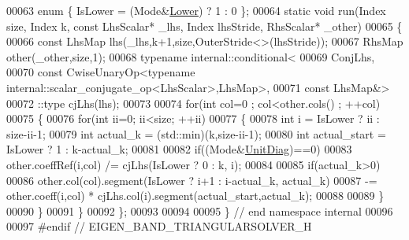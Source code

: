 \begin{DoxyCode}
00063   \textcolor{keyword}{enum} \{ IsLower = (Mode&\hyperlink{group__enums_gga39e3366ff5554d731e7dc8bb642f83cda891792b8ed394f7607ab16dd716f60e6}{Lower}) ? 1 : 0 \};
00064   \textcolor{keyword}{static} \textcolor{keywordtype}{void} run(Index size, Index k, \textcolor{keyword}{const} LhsScalar* \_lhs, Index lhsStride, RhsScalar* \_other)
00065   \{
00066     \textcolor{keyword}{const} LhsMap lhs(\_lhs,k+1,size,OuterStride<>(lhsStride));
00067     RhsMap other(\_other,size,1);
00068     \textcolor{keyword}{typename} internal::conditional<
00069                           ConjLhs,
00070                           \textcolor{keyword}{const} CwiseUnaryOp<typename internal::scalar\_conjugate\_op<LhsScalar>,LhsMap>,
00071                           \textcolor{keyword}{const} LhsMap&>
00072                         ::type cjLhs(lhs);
00073                         
00074     \textcolor{keywordflow}{for}(\textcolor{keywordtype}{int} col=0 ; col<other.cols() ; ++col)
00075     \{
00076       \textcolor{keywordflow}{for}(\textcolor{keywordtype}{int} ii=0; ii<size; ++ii)
00077       \{
00078         \textcolor{keywordtype}{int} i = IsLower ? ii : size-ii-1;
00079         \textcolor{keywordtype}{int} actual\_k = (std::min)(k,size-ii-1);
00080         \textcolor{keywordtype}{int} actual\_start = IsLower ? 1 : k-actual\_k;
00081         
00082         \textcolor{keywordflow}{if}((Mode&\hyperlink{group__enums_gga39e3366ff5554d731e7dc8bb642f83cdaddb72f888ac85d5a1c52333e54f9374b}{UnitDiag})==0)
00083           other.coeffRef(i,col) /= cjLhs(IsLower ? 0 : k, i);
00084 
00085         \textcolor{keywordflow}{if}(actual\_k>0)
00086           other.col(col).segment(IsLower ? i+1 : i-actual\_k, actual\_k)
00087               -= other.coeff(i,col) * cjLhs.col(i).segment(actual\_start,actual\_k);
00088         
00089       \}
00090     \}
00091   \}
00092 \};
00093 
00094 
00095 \} \textcolor{comment}{// end namespace internal}
00096 
00097 \textcolor{preprocessor}{#endif // EIGEN\_BAND\_TRIANGULARSOLVER\_H}
\end{DoxyCode}
